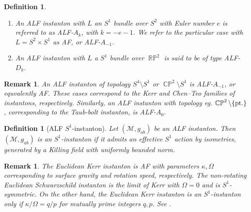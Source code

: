 \documentclass[a4paper,10pt,reqno]{amsart}
\newcommand{\cM}{\mathcal{M}}
\theoremstyle{plain}
\newtheorem{definition}[thm]{Definition}
\newtheorem{remark}[thm]{Remark}
\DeclareMathOperator{\CP}{\mathbb{C}\mathbb{P}}
\DeclareMathOperator{\RP}{\mathbb{R}\mathbb{P}}
\numberwithin{equation}{section}
\begin{document}
\begin{definition}\label{def:ALF-Ak} 
\begin{enumerate}
\item
An ALF instanton with $L$ an $S^1$ bundle over $S^2$ with Euler 
%
number $e$ is referred to as ALF-$A_k$, with $k = -e -1$. 
We refer to the particular case with $L = S^2 \times S^1$ as AF, or ALF-$A_{-1}$. 
\item An ALF instanton with $L$ a $S^1$ bundle over $\RP^2$ is said to be of type ALF-$D_k$. 
%
\end{enumerate}
\end{definition} 

\begin{remark} 
An ALF instanton of topology $S^4 \setminus S^1$ or $\CP^2\setminus S^1$ is ALF-$A_{-1}$, or equvalently AF. These cases correspond to the Kerr and Chen--Teo families of instantons, respectively. Similarly, an ALF instanton with topology eg. $\CP^2 \setminus \{\text{\rm pt.}\}$, corresponding to the Taub-bolt instanton,
is ALF-$A_0$. 
\end{remark}  


\begin{definition}[ALF $S^1$-instanton]
Let $(\cM, g_{ab})$ be an ALF instanton. Then $(\cM, g_{ab})$ is an $S^1$-instanton if it admits an effective $S^1$ action by isometries, generated by a Killing field with uniformly bounded norm.
\end{definition}

\begin{remark}
The Euclidean Kerr instanton is AF with parameters $\kappa, \Omega$ corresponding to surface gravity and rotation speed, respectively. The non-rotating Euclidean Schwarzschild instanton is the limit of Kerr with $\Omega = 0$ and is $S^1$-symmetric. On the other hand, the Euclidean Kerr instanton is an $S^1$-instanton only if $\kappa/\Omega = q/p$ for mutually prime integers $q,p$. See \cite{1998PhRvD..59b4009H}.
\end{remark}
\end{document}
